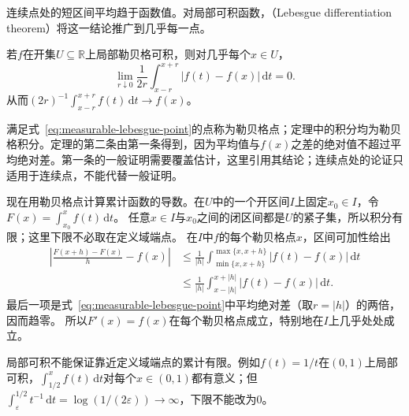 连续点处的短区间平均趋于函数值。对局部可积函数，（Lebesgue differentiation theorem）将这一结论推广到几乎每一点。
\begin{theorem}[一维Lebesgue微分定理]
\label{thm:measurable-lebesgue-differentiation}
若$f$在开集$U\subseteq\mathbb R$上局部勒贝格可积，则对几乎每个$x\in U$，
\begin{equation}
 \lim_{r\downarrow0}\frac1{2r}\int_{x-r}^{x+r}|f(t)-f(x)|\,\mathrm dt=0.
\label{eq:measurable-lebesgue-point}
\end{equation}
从而$(2r)^{-1}\int_{x-r}^{x+r}f(t)\,\mathrm dt\to f(x)$。
\end{theorem}
满足式~\eqref{eq:measurable-lebesgue-point}的点称为勒贝格点；定理中的积分均为勒贝格积分。定理的第二条由第一条得到，因为平均值与$f(x)$之差的绝对值不超过平均绝对差。第一条的一般证明需要覆盖估计，这里引用其结论；连续点处的论证只适用于连续点，不能代替一般证明。


现在用勒贝格点计算累计函数的导数。在$U$中的一个开区间$I$上固定$x_0\in I$，令$F(x)=\int_{x_0}^xf(t)\,\mathrm dt$。
任意$x\in I$与$x_0$之间的闭区间都是$U$的紧子集，所以积分有限；这里下限不必取在定义域端点。
在$I$中$f$的每个勒贝格点$x$，区间可加性给出
\[
 \begin{aligned}
 \left|\frac{F(x+h)-F(x)}h-f(x)\right|
 &\leq\frac1{|h|}\int_{\min\{x,x+h\}}^{\max\{x,x+h\}}|f(t)-f(x)|\,\mathrm dt\\
 &\leq\frac1{|h|}\int_{x-|h|}^{x+|h|}|f(t)-f(x)|\,\mathrm dt.
 \end{aligned}
\]
最后一项是式~\eqref{eq:measurable-lebesgue-point}中平均绝对差（取$r=|h|$）的两倍，因而趋零。
所以$F'(x)=f(x)$在每个勒贝格点成立，特别地在$I$上几乎处处成立。

局部可积不能保证靠近定义域端点的累计有限。例如$f(t)=1/t$在$(0,1)$上局部可积，$\int_{1/2}^xf(t)\,\mathrm dt$对每个$x\in(0,1)$都有意义；但$\int_\varepsilon^{1/2}t^{-1}\,\mathrm dt=\log(1/(2\varepsilon))\to\infty$，下限不能改为$0$。


